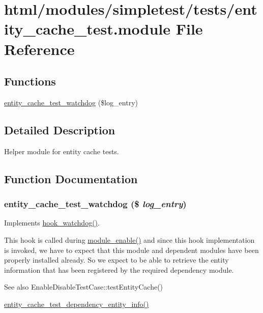 \hypertarget{entity__cache__test_8module}{
\section{html/modules/simpletest/tests/entity\_\-cache\_\-test.module File Reference}
\label{entity__cache__test_8module}
}
\subsection*{Functions}
\begin{DoxyCompactItemize}
\item 
\hyperlink{entity__cache__test_8module_ac85e216d914488e093962a30b2350015}{entity\_\-cache\_\-test\_\-watchdog} (\$log\_\-entry)
\end{DoxyCompactItemize}


\subsection{Detailed Description}
Helper module for entity cache tests. 

\subsection{Function Documentation}
\hypertarget{entity__cache__test_8module_ac85e216d914488e093962a30b2350015}{
\subsubsection[{entity\_\-cache\_\-test\_\-watchdog}]{\setlength{\rightskip}{0pt plus 5cm}entity\_\-cache\_\-test\_\-watchdog (\$ {\em log\_\-entry})}}
\label{entity__cache__test_8module_ac85e216d914488e093962a30b2350015}
Implements \hyperlink{group__hooks_gab2b8bf0289fad4b39485e933012f290c}{hook\_\-watchdog()}.

This hook is called during \hyperlink{module_8inc_a4b2c9ea60d7c88595eaebfc4abd5f1bf}{module\_\-enable()} and since this hook implementation is invoked, we have to expect that this module and dependent modules have been properly installed already. So we expect to be able to retrieve the entity information that has been registered by the required dependency module.

\begin{DoxySeeAlso}{See also}
EnableDisableTestCase::testEntityCache() 

\hyperlink{entity__cache__test__dependency_8module_aefb386090205f182e44675503615ce16}{entity\_\-cache\_\-test\_\-dependency\_\-entity\_\-info()} 
\end{DoxySeeAlso}
